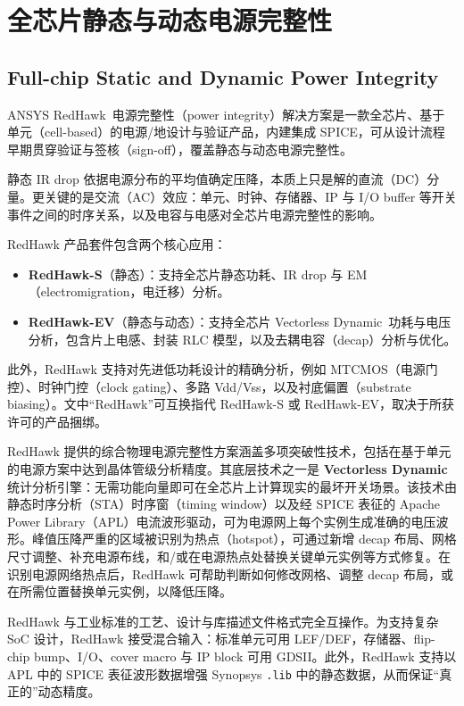 \label{chap:intro}

\section{全芯片静态与动态电源完整性}
\subsection*{Full-chip Static and Dynamic Power Integrity}

ANSYS RedHawk\texttrademark\ 电源完整性（power integrity）解决方案是一款全芯片、基于单元（cell-based）的电源/地设计与验证产品，内建集成 SPICE，可从设计流程早期贯穿验证与签核（sign-off），覆盖静态与动态电源完整性。

静态 IR drop 依据电源分布的平均值确定压降，本质上只是解的直流（DC）分量。更关键的是交流（AC）效应：单元、时钟、存储器、IP 与 I/O buffer 等开关事件之间的时序关系，以及电容与电感对全芯片电源完整性的影响。

RedHawk 产品套件包含两个核心应用：
\begin{itemize}
  \item \textbf{RedHawk-S}（静态）：支持全芯片静态功耗、IR drop 与 EM（electromigration，电迁移）分析。
  \item \textbf{RedHawk-EV}（静态与动态）：支持全芯片 Vectorless Dynamic\texttrademark\ 功耗与电压分析，包含片上电感、封装 RLC 模型，以及去耦电容（decap）分析与优化。
\end{itemize}

此外，RedHawk 支持对先进低功耗设计的精确分析，例如 MTCMOS（电源门控）、时钟门控（clock gating）、多路 Vdd/Vss，以及衬底偏置（substrate biasing）。文中“RedHawk”可互换指代 RedHawk-S 或 RedHawk-EV，取决于所获许可的产品捆绑。

RedHawk 提供的综合物理电源完整性方案涵盖多项突破性技术，包括在基于单元的电源方案中达到晶体管级分析精度。其底层技术之一是 \textbf{Vectorless Dynamic} 统计分析引擎：无需功能向量即可在全芯片上计算现实的最坏开关场景。该技术由静态时序分析（STA）时序窗（timing window）以及经 SPICE 表征的 Apache Power Library（APL）电流波形驱动，可为电源网上每个实例生成准确的电压波形。峰值压降严重的区域被识别为热点（hotspot），可通过新增 decap 布局、网格尺寸调整、补充电源布线，和/或在电源热点处替换关键单元实例等方式修复。在识别电源网络热点后，RedHawk 可帮助判断如何修改网格、调整 decap 布局，或在所需位置替换单元实例，以降低压降。

RedHawk 与工业标准的工艺、设计与库描述文件格式完全互操作。为支持复杂 SoC 设计，RedHawk 接受混合输入：标准单元可用 LEF/DEF，存储器、flip-chip bump、I/O、cover macro 与 IP block 可用 GDSII。此外，RedHawk 支持以 APL 中的 SPICE 表征波形数据增强 Synopsys \texttt{.lib} 中的静态数据，从而保证“真正的”动态精度。

